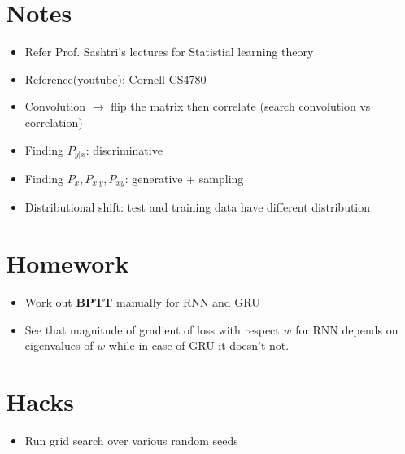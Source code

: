 \documentclass[11pt]{article}
\begin{document}
\pagebreak
\section{Notes}
\label{sec:notes}

\begin{itemize}
\item Refer Prof. Sashtri's lectures for Statistial learning theory
\item Reference(youtube): Cornell CS4780
\item Convolution $\rightarrow$ flip the matrix then correlate (search convolution vs correlation)
  
\item Finding $P_{y|x}$: discriminative
\item Finding $P_x, P_{x|y}, P_{xy}$: generative + sampling
\item Distributional shift: test and training data have different distribution
\end{itemize}

\section{Homework}
\label{sec:homework}

\begin{itemize}
\item Work out \textbf{BPTT} manually for RNN and GRU
  
\item See that magnitude of gradient of loss with respect $w$ for RNN depends on eigenvalues of $w$ while in case of GRU it doesn't not.
\end{itemize}

\section{Hacks}
\label{sec:hacks}

\begin{itemize}
\item Run grid search over various random seeds
\end{itemize}
\end{document}
